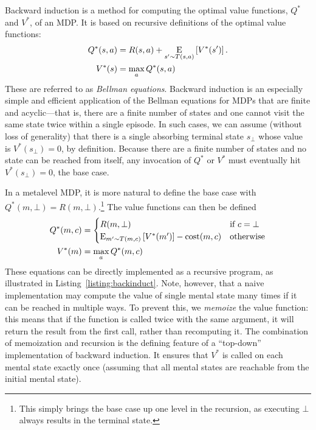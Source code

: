 Backward induction is a method for computing the optimal value functions, $Q^*$ and $V^*$, of an MDP. It is based on recursive definitions of the optimal value functions:
\begin{equation}\label{eq:value-recursive}
\begin{aligned}
    Q^*(s, a) &= R(s, a) + \expectunder{V^*(s')}{s' \sim T(s,a)}.\\
    V^*(s) &= \max_a Q^*(s, a)
\end{aligned}
\end{equation}
These are referred to as \emph{Bellman equations}. Backward induction is an especially simple and efficient application of the Bellman equations for MDPs that are finite and acyclic---that is, there are a finite number of states and one cannot visit the same state twice within a single episode. In such cases, we can assume (without loss of generality) that there is a single absorbing terminal state $s_\bot$ whose value is $V^*(s_\bot) = 0$, by definition. Because there are a finite number of states and no state can be reached from itself, any invocation of $Q^*$ or $V^*$ must eventually hit $V^*(s_\bot) = 0$, the base case.

In a metalevel MDP, it is more natural to define the base case with $Q^*(m, \bot) = R(m, \bot)$.\footnote{%
  This simply brings the base case up one level in the recursion, as executing $\bot$ always results in the terminal state.
} The value functions can then be defined
\begin{equation}\label{eq:value-recursive-meta}
\begin{aligned}
    Q^*(m, c) &= \begin{cases}
      R(m, \bot) &\text{if } c = \bot \\
      \expectunder{V^*(m')}{m' \sim T(m,c)} - \cost(m, c) &\text{otherwise}
    \end{cases} \\
    V^*(m) &= \max_a Q^*(m, c)
\end{aligned}
\end{equation}
These equations can be directly implemented as a recursive program, as illustrated in Listing~\ref{listing:backinduct}. Note, however, that a naive implementation may compute the value of single mental state many times if it can be reached in multiple ways. To prevent this, we \emph{memoize} the value function: this means that if the function is called twice with the same argument, it will return the result from the first call, rather than recomputing it. The combination of memoization and recursion is the defining feature of a ``top-down'' implementation of backward induction. It ensures that $V^*$ is called on each mental state exactly once (assuming that all mental states are reachable from the initial mental state).


